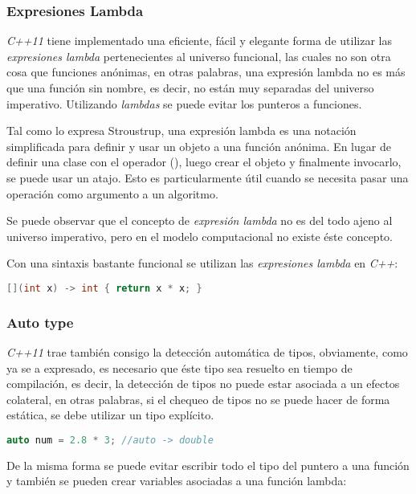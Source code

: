 	\subsubsection{Expresiones Lambda}
		\emph{C++11} tiene implementado una eficiente, fácil y elegante forma de utilizar las \emph{expresiones lambda} pertenecientes al universo funcional, las cuales no son otra cosa que funciones anónimas, en otras palabras, una expresión lambda no es más que una función sin nombre, es decir, no están muy separadas del universo imperativo. Utilizando \emph{lambdas} se puede evitar los punteros a funciones.
		
		Tal como lo expresa Stroustrup, una expresión lambda es una notación simplificada para definir y usar un objeto a una función anónima. En lugar de definir una clase con el operador (), luego crear el objeto y finalmente invocarlo, se puede usar un atajo. Esto es particularmente útil cuando se necesita pasar una operación como argumento a un algoritmo.\cite{Bjarne2013}
		
		Se puede observar que el concepto de \emph{expresión lambda} no es del todo ajeno al universo imperativo, pero en el modelo computacional no existe éste concepto.
		
		Con una sintaxis bastante funcional se utilizan las \emph{expresiones lambda} en \emph{C++}:
		
		\begin{lstlisting}[language=C++, caption=Lambda para elevar al cuadrado un número en C++]
			[](int x) -> int { return x * x; }
		\end{lstlisting}
	
	\subsubsection{Auto type}
		\emph{C++11} trae también consigo la detección automática de tipos, obviamente, como ya se a expresado, es necesario que éste tipo sea resuelto en tiempo de compilación, es decir, la detección de tipos no puede estar asociada a un efectos colateral, en otras palabras, si el chequeo de tipos no se puede hacer de forma estática, se debe utilizar un tipo explícito.
	
		\begin{lstlisting}[language=C++, caption=Auto type en C++]
			auto num = 2.8 * 3; //auto -> double
		\end{lstlisting}
		
		De la misma forma se puede evitar escribir todo el tipo del puntero a una función y también se pueden crear variables asociadas a una función lambda:
		
